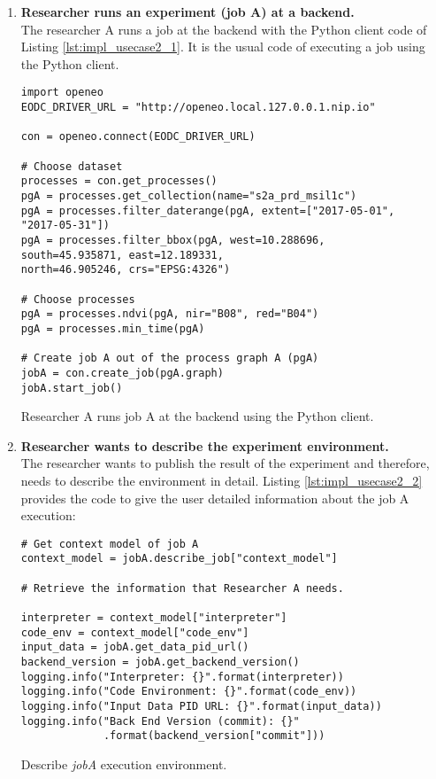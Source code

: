 \documentclass[draft,final]{vutinfth} %
\newenvironment{code}{\captionsetup{type=listing}}{}
\begin{document}
\begin{enumerate}
	\item \textbf{Researcher runs an experiment (job A) at a backend.}\\
	The researcher A runs a job at the backend with the Python client code of Listing \ref{lst:impl_usecase2_1}.  It is the usual code of executing a job using the Python client. 

\begin{code}
	\begin{verbatim}
import openeo
EODC_DRIVER_URL = "http://openeo.local.127.0.0.1.nip.io"

con = openeo.connect(EODC_DRIVER_URL)

# Choose dataset
processes = con.get_processes()
pgA = processes.get_collection(name="s2a_prd_msil1c")
pgA = processes.filter_daterange(pgA, extent=["2017-05-01", 
"2017-05-31"])
pgA = processes.filter_bbox(pgA, west=10.288696, 
south=45.935871, east=12.189331, 
north=46.905246, crs="EPSG:4326")

# Choose processes
pgA = processes.ndvi(pgA, nir="B08", red="B04")
pgA = processes.min_time(pgA)

# Create job A out of the process graph A (pgA)
jobA = con.create_job(pgA.graph)
jobA.start_job()
	\end{verbatim}
	\caption{Researcher A runs job A at the backend using the Python client.}
	\label{lst:impl_usecase2_1}
\end{code}

	\item \textbf{Researcher wants to describe the experiment environment.}\\
	The researcher wants to publish the result of the experiment and therefore, needs to describe the environment in detail. Listing \ref{lst:impl_usecase2_2} provides the code to give the user detailed information about the job A execution:

\begin{code}
	\begin{verbatim}
# Get context model of job A
context_model = jobA.describe_job["context_model"]

# Retrieve the information that Researcher A needs.

interpreter = context_model["interpreter"]
code_env = context_model["code_env"]
input_data = jobA.get_data_pid_url()
backend_version = jobA.get_backend_version()
logging.info("Interpreter: {}".format(interpreter))
logging.info("Code Environment: {}".format(code_env))
logging.info("Input Data PID URL: {}".format(input_data))
logging.info("Back End Version (commit): {}"
             .format(backend_version["commit"]))
	\end{verbatim}
	\caption{Describe \textit{jobA} execution environment.}
	\label{lst:impl_usecase2_2}
\end{code}


\end{enumerate}
\end{document}
